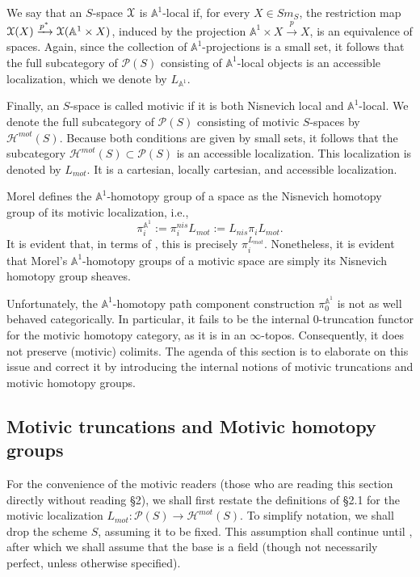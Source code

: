 We say that an $S$-space $\EuScript{X}$ is $\mathbb{A}^1$-local if, for every $X\in Sm_S$, the restriction map $\EuScript{X}(X)\xrightarrow{p^*}\EuScript{X}(\mathbb{A}^1\times X)$, induced by the projection $\mathbb{A}^1\times X\xrightarrow{p} X$, is an equivalence of spaces. Again, since the collection of $\mathbb{A}^1$-projections is a small set, it follows that the full subcategory of $\mathcal{P}(S)$ consisting of $\mathbb{A}^1$-local objects is an accessible localization, which we denote by $L_{\mathbb{A}^1}$.

Finally, an $S$-space is called motivic if it is both Nisnevich local and $\mathbb{A}^1$-local. We denote the full subcategory of $\mathcal{P}(S)$ consisting of motivic $S$-spaces by $\mathcal{H}^{mot}(S)$. Because both conditions are given by small sets, it follows that the subcategory $\mathcal{H}^{mot}(S)\subset \mathcal{P}(S)$ is an accessible localization. This localization is denoted by $L_{mot}$. It is a cartesian, locally cartesian, and accessible localization. 

Morel defines the $\mathbb{A}^1$-homotopy group of a space as the Nisnevich homotopy group of its motivic localization, i.e., $$\pi_i^{\mathbb{A}^1}:=\pi_i^{nis}L_{mot}:=L_{nis}\pi_iL_{mot}.$$ It is evident that, in terms of , this is precisely $\pi_i^{L_{mot}}$. 
Nonetheless, it is evident that Morel's $\mathbb{A}^1$-homotopy groups of a motivic space are simply its Nisnevich homotopy group sheaves. 
 
Unfortunately, the $\mathbb{A}^1$-homotopy path component construction $\pi_0^{\mathbb{A}^1}$ is not as well behaved categorically. In particular, it fails to be the internal $0$-truncation functor for the motivic homotopy category, as it is in an $\infty$-topos. Consequently, it does not preserve (motivic) colimits. The agenda of this section is to elaborate on this issue and correct it by introducing the internal notions of motivic truncations and motivic homotopy groups.



\subsection{Motivic truncations and Motivic homotopy groups} 

For the convenience of the motivic readers (those who are reading this section directly without reading \S2), we shall first restate the definitions of \S2.1 for the motivic localization $L_{mot}:\mathcal{P}(S)\to \mathcal{H}^{mot}(S)$. To simplify notation, we shall drop the scheme $S$, assuming it to be fixed. This assumption shall continue until , after which we shall assume that the base is a field (though not necessarily perfect, unless otherwise specified).

